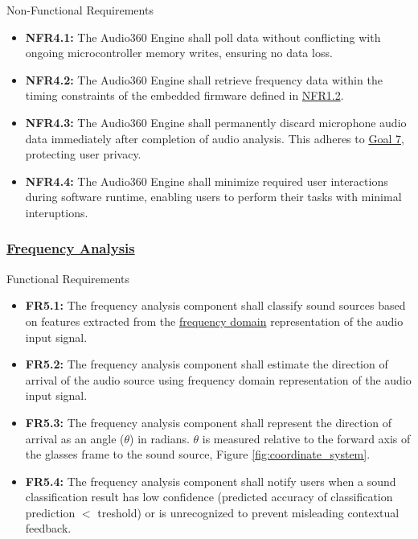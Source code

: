 \documentclass[12pt]{article}
\theoremstyle{definition}
\begin{document}
Non-Functional Requirements
\begin{itemize}
  \item \label{NFR4_1}\textbf{NFR4.1:} The Audio360 Engine shall poll data
  without conflicting with ongoing microcontroller memory writes, ensuring no
  data loss.

  \item \label{NFR4_2}\textbf{NFR4.2:} The Audio360 Engine shall retrieve
  frequency data within the timing constraints of the embedded firmware defined
  in \hyperref[NFR1_2]{NFR1.2}.

  \item \label{NFR4_3}\textbf{NFR4.3:} The Audio360 Engine shall permanently
  discard microphone audio data immediately after completion of audio analysis.
  This adheres to \hyperref[goal:user_safety]{Goal 7}, protecting user privacy.

  \item \label{NFR4_4}\textbf{NFR4.4:} The Audio360 Engine shall minimize 
  required user interactions during software runtime, enabling users to
  perform their tasks with minimal interuptions.
\end{itemize}

\subsubsection{\hyperref[comp:frequency_analysis]{Frequency Analysis}}
Functional Requirements
\begin{itemize}
    \item \label{FR5_1}\textbf{FR5.1:} The frequency analysis component shall
    classify sound sources based on features extracted from the
    \hyperref[def:frequency_domain]{frequency domain} representation of the
    audio input signal.

   \item \label{FR5_2}\textbf{FR5.2:} The frequency analysis component shall
   estimate the direction of arrival of the audio source using frequency domain
   representation of the audio input signal. 
   
   \item \label{FR5_3}\textbf{FR5.3:} The frequency analysis component shall
   represent the direction of arrival as an angle ($\theta$) in radians.
   $\theta$ is measured relative to the forward axis of the glasses frame to the
   sound source, Figure \ref{fig:coordinate_system}.

   \item \label{FR5_4}\textbf{FR5.4:} The frequency analysis component shall
   notify users when a sound classification result has low confidence
   (predicted accuracy of classification prediction $<$ treshold) or is
   unrecognized to prevent misleading contextual feedback.
\end{itemize}
\end{document}
